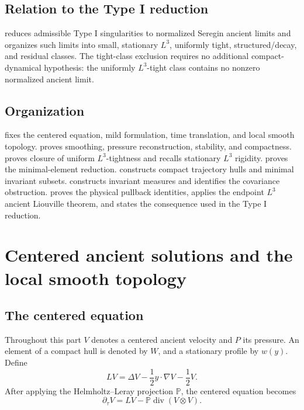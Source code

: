\documentclass[11pt]{amsart}
\theoremstyle{plain}
\theoremstyle{definition}
\theoremstyle{remark}
\numberwithin{equation}{section}
\newcommand{\divergence}{\operatorname{div}}
\begin{document}
\subsection{Relation to the Type I reduction}

 reduces admissible Type I singularities
to normalized Seregin ancient limits and organizes such limits into small,
stationary \(L^3\), uniformly tight, structured/decay, and residual classes.
The tight-class exclusion requires no additional compact-dynamical hypothesis:
the uniformly \(L^3\)-tight class contains no
nonzero normalized ancient limit.

\subsection{Organization}

 fixes the centered equation, mild formulation,
time translation, and local smooth topology.  
proves smoothing, pressure reconstruction, stability, and compactness.
 proves closure of uniform \(L^3\)-tightness and
recalls stationary \(L^3\) rigidity.   proves the
minimal-element reduction.   constructs compact
trajectory hulls and minimal invariant subsets.  
constructs invariant measures and identifies the covariance obstruction.
 proves the physical pullback identities,
applies the endpoint \(L^3\) ancient Liouville theorem, and states the
consequence used in the Type I reduction.

\section{Centered ancient solutions and the local smooth topology}
\label{p2:sec:centered-topology}

\subsection{The centered equation}

Throughout this part \(V\) denotes a centered ancient velocity and \(P\) its
pressure.  An element of a compact hull is denoted by \(W\), and a
stationary profile by \(w(y)\).  Define
\[
   L V=\Delta V-\frac12 y\cdot\nabla V-\frac12 V .
\]
After applying the Helmholtz--Leray projection \(\mathbb P\), the centered
equation becomes
\begin{equation}\label{p2:eq:projected}
   \partial_\tau V
   =
   LV-\mathbb P\divergence(V\otimes V).
\end{equation}
\end{document}
